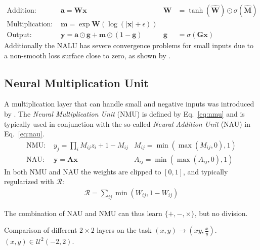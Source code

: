 \documentclass[9pt]{article}
\begin{document}
\begin{align}
  \label{eq:nalu_add}
  \text{Addition: }       & \bm a = \bm W \bm x
                          & \bm W& = \tanh(\hat{\bm W}) \odot \sigma(\hat{\bm M}) \\
  \label{eq:nalu_mult}
  \text{Multiplication: } & \bm m = \exp \bm W(\log(|\bm x|+\epsilon)) & &\\
  \text{Output: }         & \bm y = \bm a \odot \bm g + \bm m \odot (1-\bm g) 
                          & \bm g& = \sigma(\bm G\bm x)
\end{align}
Additionally the NALU has severe convergence problems for small inputs due to
a non-smooth loss surface close to zero, as shown by \cite{madsen_neural_2020}.

\subsection{Neural Multiplication Unit}%
\label{sub:neural_multiplication_unit}

A multiplication layer that can handle small and negative inputs was introduced
by \citet{madsen_neural_2020}.  The \emph{Neural Multiplication Unit} (NMU) is
defined by Eq.~\ref{eq:nmu} and is typically used in conjunction with the
so-called \emph{Neural Addition Unit} (NAU) in Eq.~\ref{eq:nau}.
\begin{align}
  \label{eq:nmu}
  \text{NMU: } &y_j = \prod_i M_{ij} z_{i} + 1 - M_{ij}  &M_{ij}=\min(\max(M_{ij}, 0), 1)\\
  \label{eq:nau}
  \text{NAU: } &\bm y = \bm A \bm x &A_{ij}=\min(\max(A_{ij}, 0), 1)
\end{align}
In both NMU and NAU the weights are clipped to $[0,1]$, and typically regularized
with $\mathcal{R}$:
\begin{align}
  \label{eq:rsparse}
  \mathcal{R} = \sum_{ij} \min(W_{ij}, 1-W_{ij})
\end{align}

The combination of NAU and NMU can thus learn $\{+,-,\times\}$, but no division.

\begin{table}
  \centering
  \caption{Comparison of different $2\times2$ layers on the task
  $(x,y)\rightarrow(xy,\frac{x}{y})$.  $(x,y) \in \mathcal U^2(-2,2)$.}
  \label{tab:compare_npu_npu_nalu}
  
\end{table}
\end{document}
